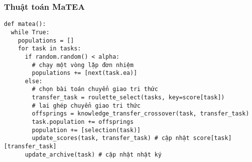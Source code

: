 \begin{frame}[fragile]
\frametitle{Thuật toán MaTEA}
\begin{verbatim}
def matea():
  while True:
    populations = []
    for task in tasks:
      if random.random() < alpha:
        # chạy một vòng lặp đơn nhiệm
        populations += [next(task.ea)]
      else:
        # chọn bài toán chuyển giao tri thức
        transfer_task = roulette_select(tasks, key=score[task])
        # lai ghép chuyển giao tri thức
        offsprings = knowledge_transfer_crossover(task, transfer_task)
        task.population += offsprings
        population += [selection(task)]
        update_scores(task, transfer_task) # cập nhật score[task][transfer_task]
      update_archive(task) # cập nhật nhật ký
\end{verbatim}
\end{frame}

